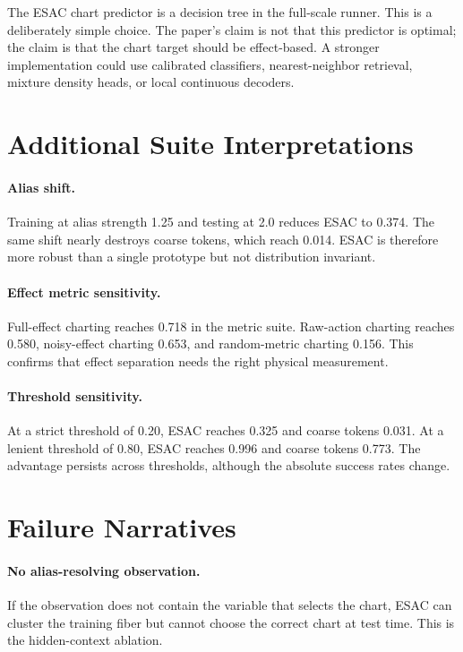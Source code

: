 \documentclass{article}
\begin{document}
The ESAC chart predictor is a decision tree in the full-scale runner. This is a
deliberately simple choice. The paper's claim is not that this predictor is
optimal; the claim is that the chart target should be effect-based. A stronger
implementation could use calibrated classifiers, nearest-neighbor retrieval,
mixture density heads, or local continuous decoders.

\section{Additional Suite Interpretations}

\paragraph{Alias shift.}
Training at alias strength 1.25 and testing at 2.0 reduces ESAC to 0.374. The
same shift nearly destroys coarse tokens, which reach 0.014. ESAC is therefore
more robust than a single prototype but not distribution invariant.

\paragraph{Effect metric sensitivity.}
Full-effect charting reaches 0.718 in the metric suite. Raw-action charting
reaches 0.580, noisy-effect charting 0.653, and random-metric charting 0.156.
This confirms that effect separation needs the right physical measurement.

\paragraph{Threshold sensitivity.}
At a strict threshold of 0.20, ESAC reaches 0.325 and coarse tokens 0.031. At a
lenient threshold of 0.80, ESAC reaches 0.996 and coarse tokens 0.773. The
advantage persists across thresholds, although the absolute success rates
change.

\section{Failure Narratives}

\paragraph{No alias-resolving observation.}
If the observation does not contain the variable that selects the chart, ESAC
can cluster the training fiber but cannot choose the correct chart at test time.
This is the hidden-context ablation.
\end{document}
